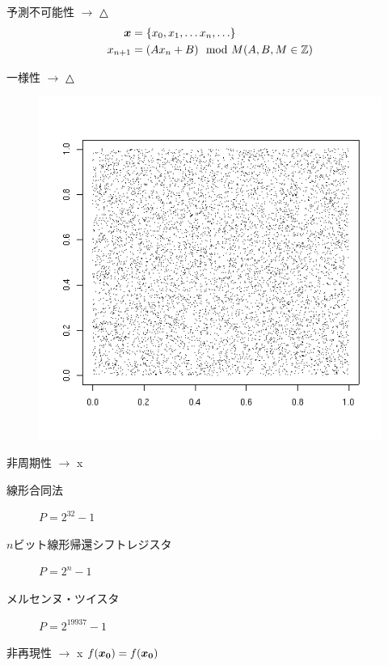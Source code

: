 \documentclass[a4j,dvipdfmx,xcolor={svgnames},19pt]{beamer}
\def\vector#1{\mbox{\boldmath $#1$}}
\begin{document}
    \begin{frame}{予測不可能性 $\rightarrow$ △}
      \begin{align}
        \vector{x} &= \{x_0,x_1,\ldots x_n, \ldots\} \\
        x_{n+1} &= (Ax_n + B) \mod M (A,B,M \in \mathbb{Z})
      \end{align}
    \end{frame}

      \begin{frame}{一様性 $\rightarrow$ △}
        \begin{figure}[htbp]
          \includegraphics[scale=0.5]{MTrand.png}
        \end{figure}
      \end{frame}

      \begin{frame}{非周期性 $\rightarrow$ x}
        \begin{description}
          \item[線形合同法] $P =2^{32} - 1$
          \item[$n$ビット線形帰還シフトレジスタ] $P = 2^n - 1$
          \item[メルセンヌ・ツイスタ] $P = 2^{19937} - 1$
        \end{description}
      \end{frame}

      \begin{frame}{非再現性 $\rightarrow$ x}
        $f(\vector{x_0}) = f(\vector{x_0})$
      \end{frame}
\end{document}

